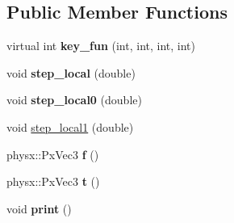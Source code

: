 \subsection*{\-Public \-Member \-Functions}
\begin{DoxyCompactItemize}
\item 
\hypertarget{classneb_1_1control_1_1rigid__body_1_1control_a66fc3682afd8f4a94ccd241cb3ddddb3}{virtual int {\bfseries key\-\_\-fun} (int, int, int, int)}\label{classneb_1_1control_1_1rigid__body_1_1control_a66fc3682afd8f4a94ccd241cb3ddddb3}

\item 
\hypertarget{classneb_1_1control_1_1rigid__body_1_1control_a0649203ba08991125250be485dad9308}{void {\bfseries step\-\_\-local} (double)}\label{classneb_1_1control_1_1rigid__body_1_1control_a0649203ba08991125250be485dad9308}

\item 
\hypertarget{classneb_1_1control_1_1rigid__body_1_1control_a347b217d2133bf301aa9f31e084ccd6a}{void {\bfseries step\-\_\-local0} (double)}\label{classneb_1_1control_1_1rigid__body_1_1control_a347b217d2133bf301aa9f31e084ccd6a}

\item 
void \hyperlink{classneb_1_1control_1_1rigid__body_1_1control_a6fad3693d3a31440201a928bc04e71d4}{step\-\_\-local1} (double)
\item 
\hypertarget{classneb_1_1control_1_1rigid__body_1_1control_a4b51c1ac90d228397fbcc996aa04efec}{physx\-::\-Px\-Vec3 {\bfseries f} ()}\label{classneb_1_1control_1_1rigid__body_1_1control_a4b51c1ac90d228397fbcc996aa04efec}

\item 
\hypertarget{classneb_1_1control_1_1rigid__body_1_1control_a3484ab6759dc00ec4d84f91829351c77}{physx\-::\-Px\-Vec3 {\bfseries t} ()}\label{classneb_1_1control_1_1rigid__body_1_1control_a3484ab6759dc00ec4d84f91829351c77}

\item 
\hypertarget{classneb_1_1control_1_1rigid__body_1_1control_a13cbe1e4aa9e9cbd38cc2424526779a3}{void {\bfseries print} ()}\label{classneb_1_1control_1_1rigid__body_1_1control_a13cbe1e4aa9e9cbd38cc2424526779a3}

\end{DoxyCompactItemize}

